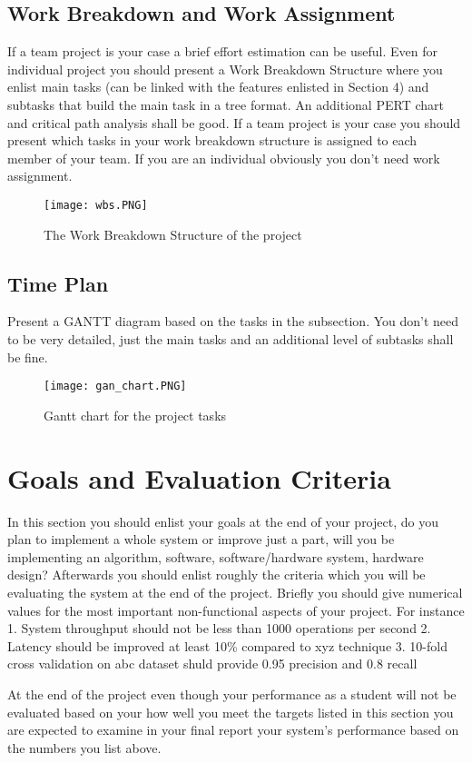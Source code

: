 \documentclass[a4paper, 12pt, titlepage]{article}
\begin{document}
\subsection{Work Breakdown and Work Assignment}
If a team project is your case a brief effort estimation can be useful. Even for individual project you should present a Work Breakdown Structure where you enlist main tasks (can be linked with the features enlisted in Section 4) and subtasks that build the main task in a tree format. An additional PERT chart and critical path analysis shall be good. If a team project is your case you should present which tasks in your work breakdown structure is assigned to each member of your team. If you are an individual obviously you don't need work assignment.
\begin{figure}[H]
    \centering
    \texttt{[image: wbs.PNG]}
    \caption{The Work Breakdown Structure of the project}
    \label{fig:wbs}
\end{figure}

\subsection{Time Plan}

Present a GANTT diagram based on the tasks in the subsection. You don't need to be very detailed, just the main tasks and an additional level of subtasks shall be fine.

\begin{figure}[H]
    \centering
    \texttt{[image: gan\_chart.PNG]}
    \caption{Gantt chart for the project tasks}
    \label{fig:gantt}
\end{figure}



\newpage
\section{Goals and Evaluation Criteria}

In this section you should enlist your goals at the end of your project, do you plan to implement a whole system or improve just a part, will you be implementing an algorithm, software, software/hardware system, hardware design?
Afterwards you should enlist roughly the criteria which you will be evaluating the system at the end of the project. Briefly you should give numerical values for the most important non-functional aspects of your project. For instance
1.	System throughput should not be less than 1000 operations per second
2.	Latency should be improved at least 10\% compared to xyz technique
3.	10-fold cross validation on abc dataset shuld provide 0.95 precision and 0.8 recall

At the end of the project even though your performance as a student will not be evaluated based on your how well you meet the targets listed in this section you are expected to examine in your final report your system's performance based on the numbers you list above.


\newpage


\end{document}
